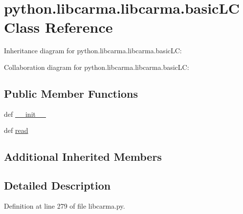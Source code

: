 \hypertarget{classpython_1_1libcarma_1_1libcarma_1_1basic_l_c}{\section{python.\-libcarma.\-libcarma.\-basic\-L\-C Class Reference}
\label{classpython_1_1libcarma_1_1libcarma_1_1basic_l_c}
}


Inheritance diagram for python.\-libcarma.\-libcarma.\-basic\-L\-C\-:


Collaboration diagram for python.\-libcarma.\-libcarma.\-basic\-L\-C\-:
\subsection*{Public Member Functions}
\begin{DoxyCompactItemize}
\item 
def \hyperlink{classpython_1_1libcarma_1_1libcarma_1_1basic_l_c_a8ca92acb17f4331e03d78a24e868c780}{\-\_\-\-\_\-init\-\_\-\-\_\-}
\item 
def \hyperlink{classpython_1_1libcarma_1_1libcarma_1_1basic_l_c_a76ec0879f1c655ea59e3e31c9b639e40}{read}
\end{DoxyCompactItemize}
\subsection*{Additional Inherited Members}


\subsection{Detailed Description}


Definition at line 279 of file libcarma.\-py.



